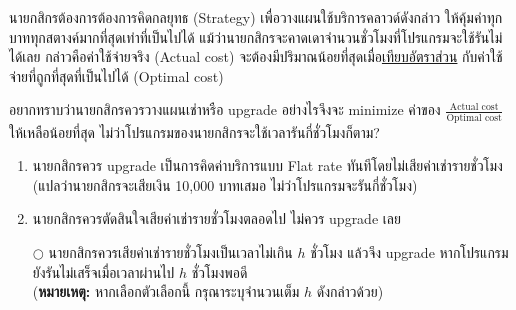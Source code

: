 นายกสิกรต้องการต้องการคิดกลยุทธ (Strategy) เพื่อวางแผนใช้บริการคลาวด์ดังกล่าว
ให้คุ้มค่าทุกบาททุกสตางค์มากที่สุดเท่าที่เป็นไปได้ แม้ว่านายกสิกรจะคาดเดาจำนวนชั่วโมงที่โปรแกรมจะใช้รันไม่ได้เลย\;
กล่าวคือค่าใช้จ่ายจริง (Actual cost) จะต้องมีปริมาณน้อยที่สุดเมื่อ\uline{เทียบอัตราส่วน}%
กับค่าใช้จ่ายที่ถูกที่สุดที่เป็นไปได้ (Optimal cost)

อยากทราบว่านายกสิกรควรวางแผนเช่าหรือ upgrade อย่างไรจึงจะ
minimize ค่าของ $\frac{\text{Actual cost}}{\text{Optimal cost}}$ 
ให้เหลือน้อยที่สุด ไม่ว่าโปรแกรมของนายกสิกรจะใช้เวลารันกี่ชั่วโมงก็ตาม?
\begin{enumerate}[label={$\Circle$}]
    \item นายกสิกรควร upgrade เป็นการคิดค่าบริการแบบ Flat rate ทันทีโดยไม่เสียค่าเช่ารายชั่วโมง
        (แปลว่านายกสิกรจะเสียเงิน 10,000 บาทเสมอ ไม่ว่าโปรแกรมจะรันกี่ชั่วโมง)
    \item นายกสิกรควรตัดสินใจเสียค่าเช่ารายชั่วโมงตลอดไป ไม่ควร upgrade เลย
    \item[\llap{*}$\Circle$] นายกสิกรควรเสียค่าเช่ารายชั่วโมงเป็นเวลาไม่เกิน $h$ ชั่วโมง 
        แล้วจึง upgrade หากโปรแกรมยังรันไม่เสร็จเมื่อเวลาผ่านไป $h$ ชั่วโมงพอดี \\ 
        (\textbf{หมายเหตุ:} หากเลือกตัวเลือกนี้ กรุณาระบุจำนวนเต็ม $h$ ดังกล่าวด้วย)
\end{enumerate}
